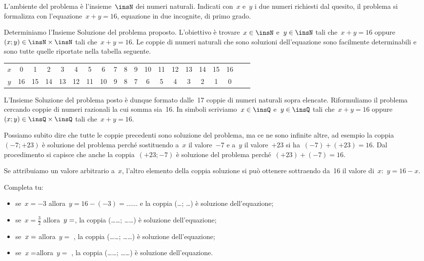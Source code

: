 \begin{soluzione}
L'ambiente del problema è l'insieme~\(\insN\) dei numeri naturali. Indicati 
con~\(x\) e~\(y\) i due numeri
richiesti dal quesito, il problema si formalizza con l'equazione~\(x+y=16\), 
equazione in due incognite, di
primo grado.

Determiniamo l'Insieme Soluzione del problema proposto.
L'obiettivo è trovare~\(x\in\insN\) e~\(y\in\insN\) tali che~\(x+y=16\) 
oppure~\((x;y)\in\insN\times\insN\) tali che~\(x+y=16\).
Le coppie di numeri naturali che sono soluzioni
dell'equazione sono facilmente determinabili e sono
tutte quelle riportate nella tabella seguente.

\begin{tabular}{cccccccccccccccccccc}
\toprule
\(x\) & 0 & 1 & 2 & 3 & 4 & 5 & 6 & 7 & 8 & 9 & 10 & 11 & 12 & 13 & 14 & 15 & 16\\
\(y\) & 16 & 15 & 14 & 13 & 12 & 11 & 10 & 9 & 8 & 7 & 6 & 5 & 4 & 3 & 2 & 1 & 0\\
\bottomrule
\end{tabular}

L'Insieme Soluzione del problema posto è dunque
formato dalle~17 coppie di numeri naturali sopra elencate.
Riformuliamo il problema cercando coppie di numeri razionali la cui
somma sia~16.
In simboli scriviamo~\(x\in\insQ\) e~\(y\in\insQ\) tali che~\(x+y=16\) 
oppure~\((x;y)\in\insQ\times\insQ\) tali che~\(x+y=16\).

Possiamo subito dire che tutte le coppie precedenti sono soluzione del
problema, ma ce ne sono infinite altre, ad esempio la coppia~\((-7;+23)\) è 
soluzione del problema perché sostituendo a~\(x\) il
valore~\(-7\) e a~\(y\) il valore~\(+23\) si ha~\((-7)+(+23)=16\).
Dal procedimento si capisce che anche la coppia~\((+23;-7)\) è
soluzione del problema perché~\((+23)+(-7)=16\).

Se attribuiamo un valore arbitrario a~\(x\), l'altro
elemento della coppia soluzione si può ottenere sottraendo da~16 il
valore di~\(x\):~\(y=16-x\).

Completa tu:

\begin{itemize}
\item se~\(x=-3\) allora~\(y=16-(-3)=\ldots\ldots\) e la coppia (\ldots; \ldots) è 
soluzione dell'equazione;
\item se~\(x=\frac{3}{2}\) allora~\(y =\dotfill\), la coppia (\ldots\ldots; 
\ldots\ldots) è soluzione dell'equazione;
\item se~\(x =\dotfill\) allora~\(y=\) \dotfill, la coppia (\ldots\ldots; 
\ldots\ldots) è soluzione dell'equazione;
\item se~\(x=\dotfill\)allora~\(y =\) \dotfill, la coppia (\ldots\ldots; 
\ldots\ldots) è soluzione dell'equazione.
\end{itemize}


\end{soluzione}
